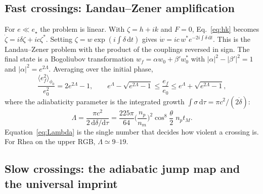 \documentclass[11pt,a4paper]{article}
\newcommand{\estar}{e_\star}
\newcommand{\dd}{\mathrm{d}}
\begin{document}
\subsection{Fast crossings: Landau--Zener amplification}\label{sec:LZ}

For $e\ll\estar$ the problem is linear. With $\zeta=h+ik$ and $F=0$, Eq.~\eqref{eq:hk} becomes $\dot\zeta=i\delta\zeta+ic\zeta^*$. Setting $\zeta=w\exp(i\!\int\!\delta\,\dd t)$ gives $\dot w=ic\,w^*e^{-2i\int\delta\,\dd t}$. This is the Landau--Zener problem \citep{Landau1932,Zener1932} with the product of the couplings reversed in sign. The final state is a Bogoliubov transformation $w_f=\alpha w_0+\beta' w_0^*$ with $|\alpha|^2-|\beta'|^2=1$ and $|\alpha|^2=e^{2\Lambda}$. Averaging over the initial phase,
\begin{equation}
\frac{\langle e_f^2\rangle_{\phi_0}}{e_0^2}=2e^{2\Lambda}-1,\qquad e^{\Lambda}-\sqrt{e^{2\Lambda}-1}\le\frac{e_f}{e_0}\le e^{\Lambda}+\sqrt{e^{2\Lambda}-1},
\label{eq:LZ}
\end{equation}
where the adiabaticity parameter is the integrated growth $\int\sigma\,\dd\tau=\pi c^2/(2\dot\delta)$:
\begin{equation}
\Lambda=\frac{\pi c^2}{2\,\dd\delta/\dd\tau}=\frac{225\pi}{64}\Big(\frac{n_p}{n_m}\Big)^{2}\cos^8\!\frac{\theta}{2}\;n_pt_M .
\label{eq:Lambda}
\end{equation}
Equation~\eqref{eq:Lambda} is the single number that decides how violent a crossing is. For Rhea on the upper RGB, $\Lambda\simeq9$--$19$.

\subsection{Slow crossings: the adiabatic jump map and the universal imprint}\label{sec:adiabatic}
\end{document}
